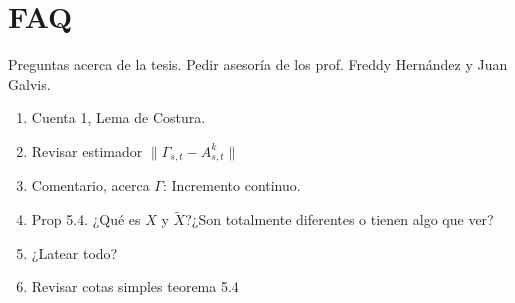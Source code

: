 
\section{FAQ}

Preguntas acerca de la tesis. Pedir asesoría de los prof. Freddy Hernández y Juan Galvis.

\begin{enumerate}
	
	\item Cuenta 1, Lema de Costura.
	\item Revisar estimador $\lVert \Gamma_{s,t} - A^k_{s,t} \rVert$
	\item Comentario, acerca $\Gamma$: Incremento continuo.

	\item Prop 5.4. ¿Qué es $X$ y $\tilde{X}$?¿Son totalmente diferentes o tienen algo que ver?
	\item ¿Latear todo?
	\item Revisar cotas simples teorema 5.4
\end{enumerate}
